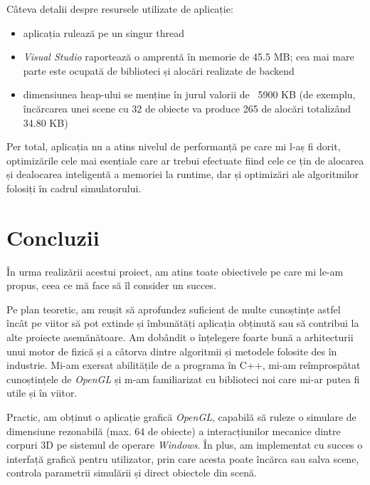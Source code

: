 \documentclass[12pt,a4paper]{report}
\begin{document}
Câteva detalii despre resursele utilizate de aplicație:
\begin{itemize}
	\item aplicația rulează pe un singur thread
	\item \textit{Visual Studio} raportează o amprentă în memorie de 45.5 MB; cea mai mare parte este ocupată de biblioteci și alocări realizate de backend
	\item dimensiunea heap-ului se menține în jurul valorii de ~5900 KB (de exemplu, încărcarea unei scene cu 32 de obiecte va produce 265 de alocări totalizând 34.80 KB)
\end{itemize}


Per total, aplicația nu a atins nivelul de performanță pe care mi l-aș fi dorit, optimizările cele mai esențiale care ar trebui efectuate fiind cele ce țin de alocarea și dealocarea inteligentă a memoriei la runtime, dar și optimizări ale algoritmilor folosiți în cadrul simulatorului.

\chapter{Concluzii}

În urma realizării acestui proiect, am atins toate obiectivele pe care mi le-am propus, ceea ce mă face să îl consider un succes.

Pe plan teoretic, am reușit să aprofundez suficient de multe cunoștințe astfel încât pe viitor să pot extinde și îmbunătăți aplicația obținută sau să contribui la alte proiecte asemănătoare. Am dobândit o înțelegere foarte bună a arhitecturii unui motor de fizică și a câtorva dintre algoritmii și metodele folosite des în industrie.  Mi-am exersat abilitățile de a programa în C++, mi-am reîmprospătat cunoștințele de \textit{OpenGL} și m-am familiarizat cu biblioteci noi care mi-ar putea fi utile și în viitor.

Practic, am obținut o aplicație grafică \textit{OpenGL}, capabilă să ruleze o simulare de dimensiune rezonabilă (max. 64 de obiecte) a interacțiunilor mecanice dintre corpuri 3D pe sistemul de operare \textit{Windows}. În plus, am implementat cu succes o interfață grafică pentru utilizator, prin care acesta poate încărca sau salva scene, controla parametrii simulării și direct obiectele din scenă.
\end{document}
